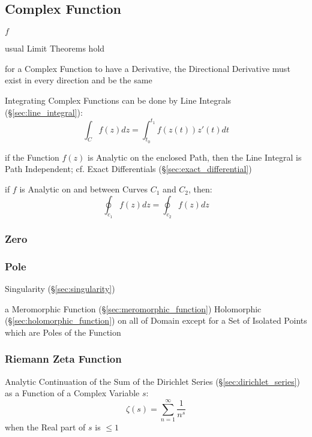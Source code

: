 \subsection{Complex Function}\label{sec:complex_function}

$f$

usual Limit Theorems hold

for a Complex Function to have a Derivative, the Directional Derivative must
exist in every direction and be the same

Integrating Complex Functions can be done by Line Integrals
(\S\ref{sec:line_integral}):
\[
  \int_{C} f(z) dz = \int_{t_0}^{t_1} f(z(t)) z'(t) dt
\]

if the Function $f(z)$ is Analytic on the enclosed Path, then the Line Integral
is Path Independent; cf. Exact Differentials (\S\ref{sec:exact_differential})

if $f$ is Analytic on and between Curves $C_1$ and $C_2$, then:
\[
  \oint_{c_1} f(z) dz = \oint_{c_2} f(z) dz
\]



\subsubsection{Zero}\label{sec:complex_zero}

\subsubsection{Pole}\label{sec:complex_pole}

Singularity (\S\ref{sec:singularity})

a Meromorphic Function (\S\ref{sec:meromorphic_function}) Holomorphic
(\S\ref{sec:holomorphic_function}) on all of Domain except for a Set of
Isolated Points which are Poles of the Function



\subsubsection{Riemann Zeta Function}\label{sec:riemann_zeta}

Analytic Continuation of the Sum of the Dirichlet Series
(\S\ref{sec:dirichlet_series}) as a Function of a Complex Variable $s$:
\[
  \zeta(s) = \sum_{n=1}^\infty \frac{1}{n^s}
\]
when the Real part of $s$ is $\leq 1$

